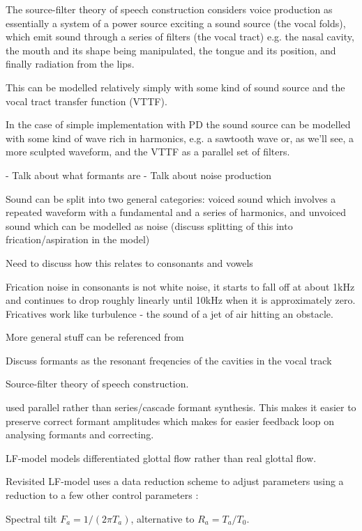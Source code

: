 The source-filter theory of speech construction considers voice production as essentially a system of a power source exciting a sound source (the vocal folds), which emit sound through a series of filters (the vocal tract) e.g. the nasal cavity, the mouth and its shape being manipulated, the tongue and its position, and finally radiation from the lips. 

This can be modelled relatively simply with some kind of sound source and the vocal tract transfer function (VTTF). 

In the case of simple implementation with PD the sound source can be modelled with some kind of wave rich in harmonics, e.g. a sawtooth wave or, as we'll see, a more sculpted waveform, and the VTTF as a parallel set of filters.

- Talk about what formants are
- Talk about noise production

Sound can be split into two general categories: voiced sound which involves a repeated waveform with a fundamental and a series of harmonics, and unvoiced sound which can be modelled as noise (discuss splitting of this into frication/aspiration in the model)

Need to discuss how this relates to consonants and vowels

Frication noise in consonants is not white noise, it starts to fall off at about 1kHz and continues to drop roughly linearly until 10kHz when it is approximately zero. \cite{Johnson2003} Fricatives work like turbulence - the sound of a jet of air hitting an obstacle. \cite{Johnson2003}

More general stuff can be referenced from \cite{Howard2008}

Discuss formants as the resonant freqencies of the cavities in the vocal track \cite{Johnson2003}

Source-filter theory of speech construction.

used parallel rather than series/cascade formant synthesis. This makes it easier to preserve correct formant amplitudes  \cite{Liljencrants1995} which makes for easier feedback loop on analysing formants and correcting.

LF-model models differentiated glottal flow rather than real glottal flow.

Revisited LF-model uses a data reduction scheme to adjust parameters using a reduction to a few other control parameters \cite{Fant1995}:

Spectral tilt $F_a = 1/(2\pi T_a)$, alternative to $R_a = T_a/T_0$.

